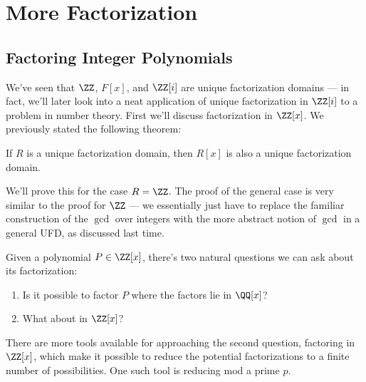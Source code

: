 

\section{More Factorization}

\subsection{Factoring Integer Polynomials}

We've seen that $\ZZ$, $F[x]$, and $\ZZ[i]$ are unique factorization domains --- in fact, we'll later look into a neat application of unique factorization in $\ZZ[i]$ to a problem in number theory. First we'll discuss factorization in $\ZZ[x]$. We previously stated the following theorem:

\begin{theorem}\label{ufd polynomial}
If $R$ is a unique factorization domain, then $R[x]$ is also a unique factorization domain. 
\end{theorem}

We'll prove this for the case $R = \ZZ$. The proof of the general case is very similar to the proof for $\ZZ$ --- we essentially just have to replace the familiar construction of the $\gcd$ over integers with the more abstract notion of $\gcd$ in a general UFD, as discussed last time. 

\begin{qq}
Given a polynomial $P \in \ZZ[x]$, there's two natural questions we can ask about its factorization:
\begin{enumerate}
    \item Is it possible to factor $P$ where the factors lie in $\QQ[x]$?
    \item What about in $\ZZ[x]$?
\end{enumerate}
\end{qq}

There are more tools available for approaching the second question, factoring in $\ZZ[x]$, which make it possible to reduce the potential factorizations to a finite number of possibilities. One such tool is reducing mod a prime $p$.

